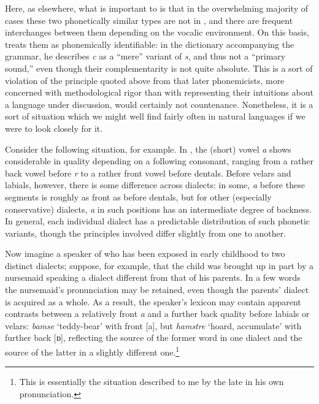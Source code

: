 Here, as elsewhere, what is important to {\Sapir} is that in the
overwhelming majority of cases these two phonetically similar types
are not in , and there are frequent interchanges between them
depending on the vocalic environment. On this basis, {\Sapir} treats them
as phonemically identifiable: in the dictionary accompanying the
 grammar, he describes \emph{c} as a ``mere'' variant of
\emph{s}, and thus not a ``primary sound,'' even though their
complementarity is not quite absolute. This is a sort of violation of
the principle quoted above from {\Harris} that later phonemicists, more
concerned with methodological rigor than with representing their
intuitions about a language under discussion, would certainly not
countenance. Nonetheless, it is a sort of situation which we might
well find fairly often in natural languages if we were to look closely
for it.

Consider the following situation, for example. In , the (short)
vowel \emph{a} shows considerable  in quality depending on a
following consonant, ranging from a rather back vowel before \emph{r}
to a rather front vowel before dentals. Before velars and labials,
however, there is some difference across dialects: in some, \emph{a}
before these segments is roughly as front as before dentals, but for
other (especially conservative) dialects, \emph{a} in such positions
has an intermediate degree of backness. In general, each individual
dialect has a predictable distribution of such phonetic variants,
though the principles involved differ slightly from one to another.

Now imagine a speaker of  who has been exposed in early
childhood to two distinct dialects; suppose, for example, that the
child was brought up in part by a nursemaid speaking a dialect
different from that of his parents. In a few words the nursemaid's
pronunciation may be retained, even though the parents' dialect is
acquired as a whole. As a result, the speaker's lexicon may contain
apparent contrasts between a relatively front \emph{a} and a further
back quality before labials or velars: \emph{bamse} `teddy-bear' with
front [a], but \emph{hamstre} `hoard, accumulate' with further back
[ɒ], reflecting the source of the former word in one dialect and the
source of the latter in a slightly different one.\footnote{This is
  essentially the situation described to me by the late 
  in his own pronunciation.}

